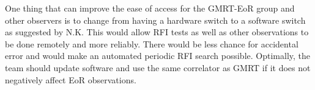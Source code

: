 \documentclass[a4paper,12pt]{article}
\begin{document}
One thing that can improve the ease of access for the GMRT-EoR group and other observers is to change from having a hardware switch to a software switch as suggested by N.K. This would allow RFI tests as well as other observations to be done remotely and more reliably. There would be less chance for accidental error and would make an automated periodic RFI search possible. Optimally, the team should update software and use the same correlator as GMRT if it does not negatively affect EoR observations.                                                                                                                                                                                                                                                                                                                                                                                                                                                                                                                                                                                                                                                                                                                                                                                                                                                                                                                                                                                                                                                                                                                                                                                                                                                                                                                                                                                                                                                                                                                                                                                                                                                                                                                                                                                                                                                                                                                                                                                                                                                                                                                                                                                                                                                                                                                                                                                                                                                                                                                                                                                                                                                                                                                                                                                                                                                                                                                                               
\end{document}
